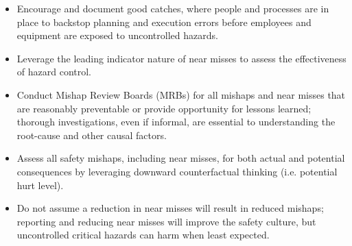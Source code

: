 \documentclass{tufte-handout}
\begin{document}
\begin{itemize}
		\item Encourage and document good catches, where people and processes are in place to backstop planning and execution errors before employees and equipment are exposed to uncontrolled hazards. 
		\item Leverage the leading indicator nature of near misses to assess the effectiveness of hazard control.
		\item Conduct Mishap Review Boards (MRBs) for all mishaps and near misses that are reasonably preventable or provide opportunity for lessons learned; thorough investigations, even if informal, are essential to understanding the root-cause and other causal factors.
		\item  Assess all safety mishaps, including near misses, for both actual and potential consequences by leveraging downward counterfactual thinking (i.e. potential hurt level).
		\item Do not assume a reduction in near misses will result in reduced mishaps; reporting and reducing near misses will improve the safety culture, but uncontrolled critical hazards can harm when least expected.
	\end{itemize}
	
	\nocite{*}
	
	
\end{document}
